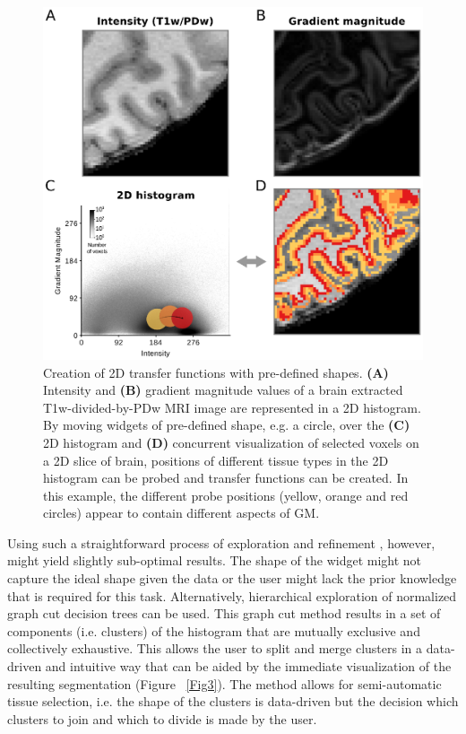 \begin{figure}[htb!]
\centering
\includegraphics[width=\textwidth]{figures/chapter_02/figure_2.eps}
\caption{Creation of 2D transfer functions with pre-defined shapes. \textbf{(A)} Intensity and \textbf{(B)} gradient magnitude values of a brain extracted T1w-divided-by-PDw MRI image are represented in a 2D histogram. By moving widgets of pre-defined shape, e.g. a circle, over the \textbf{(C)} 2D histogram and \textbf{(D)} concurrent visualization of selected voxels on a 2D slice of brain, positions of different tissue types in the 2D histogram can be probed and transfer functions can be created. In this example, the different probe positions (yellow, orange and red circles) appear to contain different aspects of GM.}
\label{Fig2}
\end{figure}

Using such a straightforward process of exploration and refinement \parencite{Kniss2002}, however, might yield slightly sub-optimal results. The shape of the widget might not capture the ideal shape given the data or the user might lack the prior knowledge that is required for this task. Alternatively, hierarchical exploration of normalized graph cut decision trees \parencite{Ip2012} can be used. This graph cut method results in a set of components (i.e. clusters) of the histogram that are mutually exclusive and collectively exhaustive. This allows the user to split and merge clusters in a data-driven and intuitive way that can be aided by the immediate visualization of the resulting segmentation (Figure ~\ref{Fig3}). The method allows for semi-automatic tissue selection, i.e. the shape of the clusters is data-driven but the decision which clusters to join and which to divide is made by the user.

